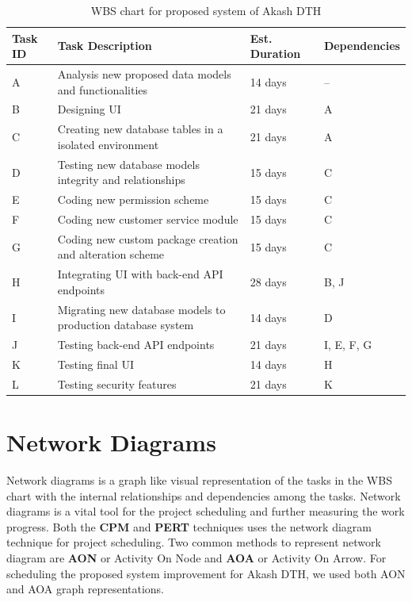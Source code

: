 \begin{spacing}{1}
\begin{table}[H]
\begin{center}
	\begin{tabular}{| p{1cm}|p{7cm}|p{2cm}|p{3cm} |}
		\hline
		Task ID & Task Description & Est. Duration & Dependencies \\
		\hline
		A & Analysis new proposed data models and functionalities & 14 days & -- \\
		\hline
		B & Designing UI & 21 days & A \\
		\hline
		C & Creating new database tables in a isolated environment & 21 days & A \\
		\hline
		D & Testing new database models integrity and relationships & 15 days & C \\
		\hline
		E & Coding new permission scheme & 15 days & C \\
		\hline
		F & Coding new customer service module & 15 days & C \\
		\hline
		G & Coding new custom package creation and alteration scheme & 15 days & C \\
		\hline
		H & Integrating UI with back-end API endpoints & 28 days & B,  J \\
		\hline
		I & Migrating new database models to production database system & 14 days & D \\
		\hline
		J & Testing back-end API endpoints & 21 days & I, E, F, G \\
		\hline
		K & Testing final UI & 14 days & H \\
		\hline
		L & Testing security features & 21 days & K \\
		\hline    
	\end{tabular}
\end{center}
\caption{WBS chart for proposed system of Akash DTH }
\label{chart:WBS}
\end{table}
  
\section{Network Diagrams}
Network diagrams is a graph like visual representation of the tasks in the WBS chart with the internal relationships and dependencies among the tasks. Network diagrams is a vital tool for the project scheduling and further measuring the work progress. Both the \textbf{CPM} and \textbf{PERT} techniques uses the network diagram technique for project scheduling. Two common methods to represent network diagram are \textbf{AON} or Activity On Node and \textbf{AOA} or Activity On Arrow. For scheduling the proposed system improvement for Akash DTH, we used both AON and AOA graph representations.


\end{spacing}
